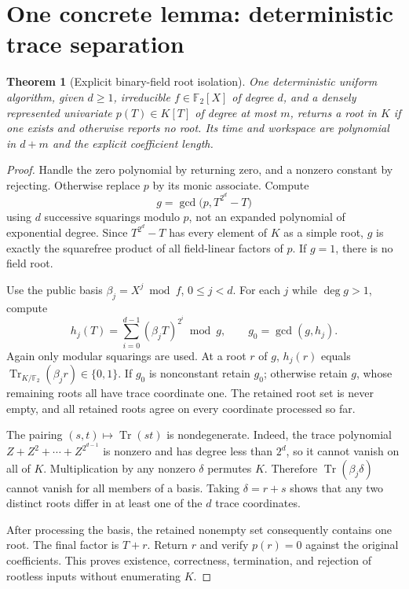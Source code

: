 \documentclass[11pt]{article}
\newtheorem{theorem}{Theorem}
\newcommand{\Tr}{\operatorname{Tr}}
\newcommand{\F}{\mathbb F}
\begin{document}
\section{One concrete lemma: deterministic trace separation}
\begin{theorem}[Explicit binary-field root isolation]\label{thm:root}
One deterministic uniform algorithm, given $d\ge1$, irreducible
$f\in\F_2[X]$ of degree $d$, and a densely represented univariate
$p(T)\in K[T]$ of degree at most $m$, returns a root in $K$ if one exists
and otherwise reports no root. Its time and workspace are polynomial in
$d+m$ and the explicit coefficient length.
\end{theorem}
\begin{proof}
Handle the zero polynomial by returning zero, and a nonzero constant by
rejecting. Otherwise replace $p$ by its monic associate. Compute
\[
 g=\gcd\bigl(p,T^{2^d}-T\bigr)                         \tag{1}
\]
using $d$ successive squarings modulo $p$, not an expanded polynomial of
exponential degree. Since $T^{2^d}-T$ has every element of $K$ as a simple
root, $g$ is exactly the squarefree product of all field-linear factors of
$p$. If $g=1$, there is no field root.

Use the public basis $\beta_j=X^j\bmod f$, $0\le j<d$. For each $j$ while
$\deg g>1$, compute
\[
 h_j(T)=\sum_{i=0}^{d-1}(\beta_j T)^{2^i}\bmod g,
 \qquad g_0=\gcd(g,h_j).                              \tag{2}
\]
Again only modular squarings are used. At a root $r$ of $g$, $h_j(r)$ equals
$\Tr_{K/\F_2}(\beta_jr)\in\{0,1\}$. If $g_0$ is nonconstant retain
$g_0$; otherwise retain $g$, whose remaining roots all have trace coordinate
one. The retained root set is never empty, and all retained roots agree on
every coordinate processed so far.

The pairing $(s,t)\mapsto\Tr(st)$ is nondegenerate. Indeed, the trace
polynomial $Z+Z^2+\cdots+Z^{2^{d-1}}$ is nonzero and has degree less than
$2^d$, so it cannot vanish on all of $K$. Multiplication by any nonzero
$\delta$ permutes $K$. Therefore $\Tr(\beta_j\delta)$ cannot vanish for
all members of a basis. Taking $\delta=r+s$ shows that any two distinct
roots differ in at least one of the $d$ trace coordinates.

After processing the basis, the retained nonempty set consequently contains
one root. The final factor is $T+r$. Return $r$ and verify $p(r)=0$ against
the original coefficients. This proves existence, correctness, termination,
and rejection of rootless inputs without enumerating $K$.
\end{proof}
\end{document}
